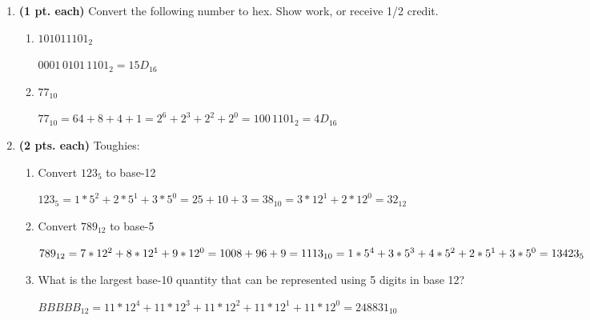 \begin{enumerate}
\begin{enumerate}
        \end{enumerate}

    \item \textbf{ (1 pt. each)} Convert the following number to hex. Show work, or receive 1/2 credit.
        \begin{enumerate}

            \item $101011101_2$
                \begin{onlysolution}    {\color{blue} \itshape$0001\, 0101\, 1101_2 = 15D_{16}$}
                \end{onlysolution}

            \item $77_{10}$
                \begin{onlysolution}    \itshape $77_{10} = 64+8+4+1=2^6+2^3+2^2+2^0=100\, 1101_2=4D_{16}$
                \end{onlysolution}

        \end{enumerate}

    \item \textbf{ (2 pts. each)} Toughies:
        \begin{enumerate}
            \item Convert $123_5$ to base-12
                \begin{onlysolution}     \itshape
                    $123_5 = 1*5^2 + 2*5^1 + 3*5^0 = 25+10+3=38_{10}=
                    3*12^1 + 2*12^0 = 32_{12}$
                \end{onlysolution}

            \item Convert $789_{12}$ to base-5
                \begin{onlysolution}
                    \itshape    $789_{12} = 7*12^2+8*12^1+9*12^0=1008+96+9=1113_{10}= \\
                    1*5^4+3*5^3 + 4*5^2 + 2*5^1 + 3*5^0 = 13423_5$
                \end{onlysolution}

            \item What is the largest base-10 quantity that can be represented
                using 5 digits in base 12?

                \begin{onlysolution}
                    \itshape $BBBBB_{12} = 11*12^4+11*12^3+11*12^2+11*12^1+11*12^0=248831_{10}$
                \end{onlysolution}


\end{enumerate}
\end{enumerate}
